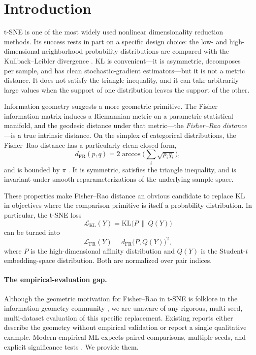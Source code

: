\documentclass[11pt]{article}
\begin{document}
\section{Introduction}

t-SNE \citep{maaten2008visualizing} is one of the most widely used nonlinear dimensionality
reduction methods. Its success rests in part on a specific design choice: the low- and
high-dimensional neighborhood probability distributions are compared with the Kullback--Leibler
divergence \citep{kullback1951information}. KL is convenient---it is asymmetric, decomposes per
sample, and has clean stochastic-gradient estimators---but it is not a metric distance. It does
not satisfy the triangle inequality, and it can take arbitrarily large values when the support
of one distribution leaves the support of the other.

Information geometry \citep{rao1945information,amari2016information,nielsen2020elementary}
suggests a more geometric primitive. The Fisher information matrix induces a Riemannian metric
on a parametric statistical manifold, and the geodesic distance under that metric---the
\emph{Fisher--Rao distance}---is a true intrinsic distance. On the simplex of categorical
distributions, the Fisher--Rao distance has a particularly clean closed form,
\begin{equation}
  d_{\mathrm{FR}}(p,q) = 2\arccos\!\Big(\textstyle\sum_i \sqrt{p_i q_i}\Big),
  \label{eq:dfr}
\end{equation}
and is bounded by $\pi$ \citep{nielsen2020elementary}. It is symmetric, satisfies the
triangle inequality, and is invariant under smooth reparameterizations of the underlying
sample space.

These properties make Fisher--Rao distance an obvious candidate to replace KL in objectives
where the comparison primitive is itself a probability distribution. In particular, the t-SNE
loss
\begin{equation}
  \mathcal{L}_{\mathrm{KL}}(Y) = \mathrm{KL}\!\big(P\,\|\,Q(Y)\big)
\end{equation}
can be turned into
\begin{equation}
  \mathcal{L}_{\mathrm{FR}}(Y) = d_{\mathrm{FR}}\!\big(P, Q(Y)\big)^2,
\end{equation}
where $P$ is the high-dimensional affinity distribution and $Q(Y)$ is the
Student-$t$ embedding-space distribution. Both are normalized over pair indices.

\paragraph{The empirical-evaluation gap.}
Although the geometric motivation for Fisher--Rao in t-SNE is folklore in the
information-geometry community \citep{nielsen2020elementary,nielsen2023fishrao}, we are
unaware of any rigorous, multi-seed, multi-dataset evaluation of this specific replacement.
Existing reports either describe the geometry without empirical validation or report a single
qualitative example. Modern empirical ML expects paired comparisons, multiple seeds, and
explicit significance tests \citep{wilcoxon1945individual,cliff1993dominance}. We provide them.
\end{document}

